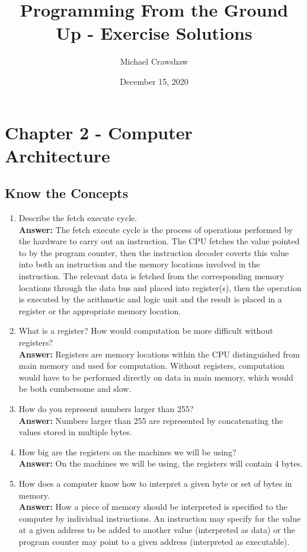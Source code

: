 \documentclass[12pt]{article}
\title{Programming From the Ground Up - Exercise Solutions}
\author{Michael Crawshaw}
\date{December 15, 2020}
\begin{document}
\maketitle


\section*{Chapter 2 - Computer Architecture}

\subsection*{Know the Concepts}
\begin{enumerate}
    \item Describe the fetch execute cycle. \\
	    \textbf{Answer:} The fetch execute cycle is the process of operations performed by the hardware to carry out an instruction. The CPU fetches the value pointed to by the program counter, then the instruction decoder coverts this value into both an instruction and the memory locations involved in the instruction. The relevant data is fetched from the corresponding memory locations through the data bus and placed into register(s), then the operation is executed by the arithmetic and logic unit and the result is placed in a register or the appropriate memory location.
    \item What is a register? How would computation be more difficult without registers? \\
        \textbf{Answer:} Registers are memory locations within the CPU distinguished from main memory and used for computation. Without registers, computation would have to be performed directly on data in main memory, which would be both cumbersome and slow.
    \item How do you represent numbers larger than 255? \\
        \textbf{Answer:} Numbers larger than 255 are represented by concatenating the values stored in multiple bytes.
    \item How big are the registers on the machines we will be using? \\
        \textbf{Answer:} On the machines we will be using, the registers will contain 4 bytes.
    \item How does a computer know how to interpret a given byte or set of bytes in memory. \\
        \textbf{Answer:} How a piece of memory should be interpreted is specified to the computer by individual instructions. An instruction may specify for the value at a given address to be added to another value (interpreted as data) or the program counter may point to a given address (interpreted as executable).

\end{enumerate}
\end{document}
